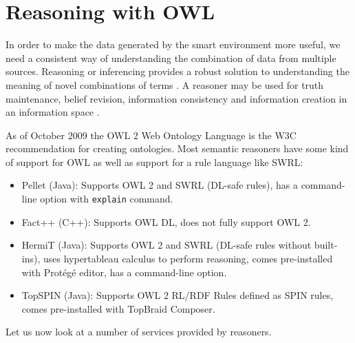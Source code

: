 \section{Reasoning with OWL}
\label{owlreasoning}
In order to make the data generated by the smart environment more useful, we need a consistent way of understanding the combination of data from multiple sources. Reasoning or inferencing provides a robust solution to understanding the meaning of novel combinations of terms \cite{Hebeler2009}. A reasoner may be used for truth maintenance, belief revision, information consistency and information creation in an information space \cite{Oliver2008}.

As of October 2009 the \ac{OWL} 2 Web Ontology Language is the W3C recommendation for creating ontologies. Most semantic reasoners have some kind of support for \ac{OWL} as well as support for a rule language like \ac{SWRL}:

\begin{itemize}
	\item Pellet (Java): Supports \ac{OWL} 2 and \ac{SWRL} (DL-safe rules), has a command-line option with \texttt{explain} command.
 	\item Fact++ (C++): Supports \ac{OWL} DL, does not fully support \ac{OWL} 2.
	\item HermiT (Java): Supports \ac{OWL} 2 and \ac{SWRL} (DL-safe rules without built-ins), uses hypertableau calculus to perform reasoning, comes pre-installed with Prot\'eg\'e editor, has a command-line option.
	\item TopSPIN (Java): Supports \ac{OWL} 2 RL/RDF Rules defined as \ac{SPIN} rules, comes pre-installed with TopBraid Composer.
\end{itemize}



Let us now look at a number of services provided by reasoners. %

